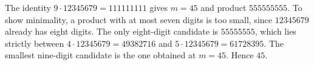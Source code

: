 The identity $9\cdot12345679=111111111$ gives $m=45$ and product $555555555$. To show minimality, a product with at most seven digits is too small, since $12345679$ already has eight digits. The only eight-digit candidate is $55555555$, which lies strictly between $4\cdot12345679=49382716$ and $5\cdot12345679=61728395$. The smallest nine-digit candidate is the one obtained at $m=45$. Hence $\boxed{45}$.
